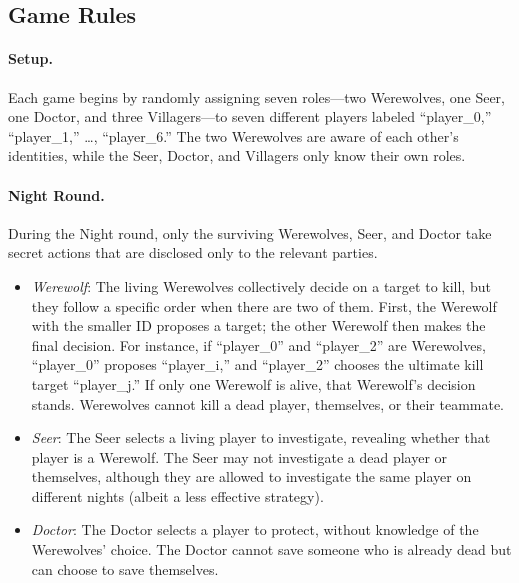 \subsection{Game Rules}

\paragraph{Setup.}
Each game begins by randomly assigning seven roles—two Werewolves, one Seer, one Doctor, and three Villagers—to seven different players labeled “player\_0,” “player\_1,” …, “player\_6.” The two Werewolves are aware of each other’s identities, while the Seer, Doctor, and Villagers only know their own roles.

\paragraph{Night Round.}
During the Night round, only the surviving Werewolves, Seer, and Doctor take secret actions that are disclosed only to the relevant parties.
\begin{itemize}
    \item \textit{Werewolf}: The living Werewolves collectively decide on a target to kill, but they follow a specific order when there are two of them. First, the Werewolf with the smaller ID proposes a target; the other Werewolf then makes the final decision. For instance, if “player\_0” and “player\_2” are Werewolves, “player\_0” proposes “player\_i,” and “player\_2” chooses the ultimate kill target “player\_j.” If only one Werewolf is alive, that Werewolf’s decision stands. Werewolves cannot kill a dead player, themselves, or their teammate.
    \item \textit{Seer}: The Seer selects a living player to investigate, revealing whether that player is a Werewolf. The Seer may not investigate a dead player or themselves, although they are allowed to investigate the same player on different nights (albeit a less effective strategy).
    \item \textit{Doctor}: The Doctor selects a player to protect, without knowledge of the Werewolves’ choice. The Doctor cannot save someone who is already dead but can choose to save themselves.
\end{itemize}

